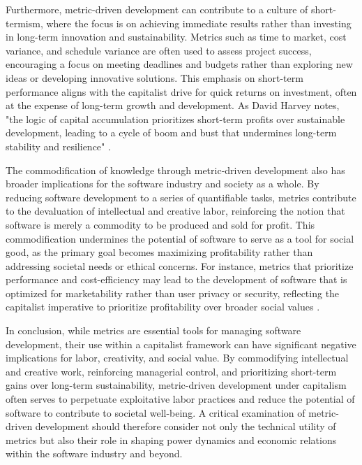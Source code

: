 \begin{refsection}
Furthermore, metric-driven development can contribute to a culture of short-termism, where the focus is on achieving immediate results rather than investing in long-term innovation and sustainability. Metrics such as time to market, cost variance, and schedule variance are often used to assess project success, encouraging a focus on meeting deadlines and budgets rather than exploring new ideas or developing innovative solutions. This emphasis on short-term performance aligns with the capitalist drive for quick returns on investment, often at the expense of long-term growth and development. As David Harvey notes, "the logic of capital accumulation prioritizes short-term profits over sustainable development, leading to a cycle of boom and bust that undermines long-term stability and resilience" \cite[pp.~47-50]{Harvey2007BriefHistory}.

The commodification of knowledge through metric-driven development also has broader implications for the software industry and society as a whole. By reducing software development to a series of quantifiable tasks, metrics contribute to the devaluation of intellectual and creative labor, reinforcing the notion that software is merely a commodity to be produced and sold for profit. This commodification undermines the potential of software to serve as a tool for social good, as the primary goal becomes maximizing profitability rather than addressing societal needs or ethical concerns. For instance, metrics that prioritize performance and cost-efficiency may lead to the development of software that is optimized for marketability rather than user privacy or security, reflecting the capitalist imperative to prioritize profitability over broader social values \cite[pp.~233-236]{Allspaw2010WebOperations}.

In conclusion, while metrics are essential tools for managing software development, their use within a capitalist framework can have significant negative implications for labor, creativity, and social value. By commodifying intellectual and creative work, reinforcing managerial control, and prioritizing short-term gains over long-term sustainability, metric-driven development under capitalism often serves to perpetuate exploitative labor practices and reduce the potential of software to contribute to societal well-being. A critical examination of metric-driven development should therefore consider not only the technical utility of metrics but also their role in shaping power dynamics and economic relations within the software industry and beyond.


\end{refsection}
